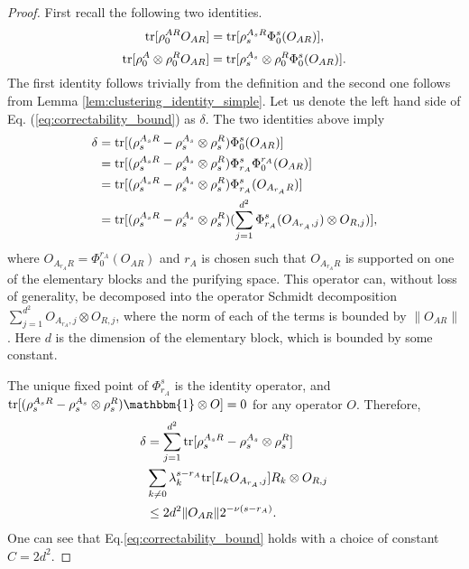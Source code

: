\documentclass[a4paper,11pt]{article}
\newcommand{\1}{\mathbbm{1}}
\newcommand{\tr}{{\rm tr}}
\begin{document}
\begin{proof}
	First recall the following two identities.
	\begin{equation}
	\tr[\rho_0^{AR} O_{AR}] = \tr[\rho_s^{A_sR} \Phi_0^{s}(O_{AR})],
	\end{equation}
	\begin{equation}
		\tr[\rho_0^A \otimes \rho_0^{R} O_{AR}] = \tr[\rho_s^{A_s}\otimes \rho_0^R \Phi_0^{s}(O_{AR})].
	\end{equation}
	The first identity follows trivially from the definition and the second one follows from Lemma \ref{lem:clustering_identity_simple}.
	Let us denote the left hand side of Eq. (\ref{eq:correctability_bound}) as $\delta$. The two identities  above imply
	\begin{align}
		\delta&=\tr[(\rho_s^{A_sR}-\rho_s^{A_s} \otimes \rho_s^{R}) \Phi_0^s(O_{AR})] \nonumber\\
								    &=\tr[(\rho_s^{A_sR}-\rho_s^{A_s} \otimes \rho_s^{R}) \Phi_{r_A}^s \Phi_0^{r_A}(O_{AR})] \nonumber\\
								    &=\tr[(\rho_s^{A_sR}-\rho_s^{A_s} \otimes \rho_s^{R}) \Phi_{r_A}^s (O_{A_{r_A}R})] \nonumber\\
								    &=\tr[(\rho_s^{A_sR}-\rho_s^{A_s} \otimes \rho_s^{R}) (\sum_{j=1}^{d^2} \Phi_{r_A}^s(O_{A_{r_A},j}) \otimes O_{R,j})],\nonumber
	\end{align}
	where $O_{A_{r_A}R}=\Phi_0^{r_A}(O_{AR})$ and $r_A$ is chosen such that $O_{A_{r_A}R}$ is supported on one of the elementary blocks and the purifying space. This operator can,
	without loss of generality,  be decomposed into the operator Schmidt decomposition $\sum_{j=1}^{d^2}  O_{A_{r_A},j} \otimes O_{R,j}$, where the norm of each of the terms is bounded
	by $\|O_{AR}\|$. Here $d$ is the dimension of the elementary block, which is bounded by some constant.

	The unique fixed point of $\Phi_{r_A}^s$ is the identity operator, and $\tr[(\rho_s^{A_sR} - \rho_s^{A_s}\otimes \rho_s^R)\1\otimes O]=0$ for any operator $O$. Therefore,
	\begin{align}
		\delta&=\sum_{j=1}^{d^2}\tr[\rho_s^{A_sR} - \rho_s^{A_s} \otimes \rho_s^{R}] \nonumber\\
		&\sum_{k\neq 0} \lambda_k^{s-r_A}\tr [L_kO_{A_{r_A},j}]R_k \otimes O_{R,j}\nonumber\\
						       &\leq 2d^2 \|O_{AR} \|2^{-\nu(s-r_A)}.
	\end{align}
One can see that Eq.\ref{eq:correctability_bound} holds with a choice of constant $C=2d^2$.
\end{proof}
\end{document}
